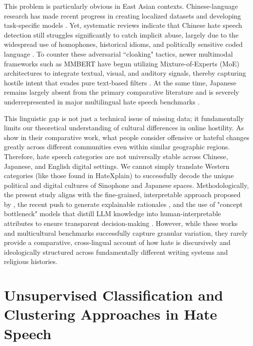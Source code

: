 \documentclass[../CLthesis.tex]{subfiles}
\begin{document}
This problem is particularly obvious in East Asian contexts. Chinese-language research has made recent progress in creating localized datasets and developing task-specific models \citep{rao_robertachinese_2023}. Yet, systematic reviews indicate that Chinese hate speech detection still struggles significantly to catch implicit abuse, largely due to the widespread use of homophones, historical idioms, and politically sensitive coded language \citep{xiao_chinese_2024}. To counter these adversarial ``cloaking" tactics, newer multimodal frameworks such as MMBERT have begun utilizing Mixture-of-Experts (MoE) architectures to integrate textual, visual, and auditory signals, thereby capturing hostile intent that evades pure text-based filters \citep{xue2025mmbertscaledmixtureofexpertsmultimodal}. At the same time, Japanese remains largely absent from the primary comparative literature and is severely underrepresented in major multilingual hate speech benchmarks \citep{corazza_multilingual_2020, aluru_deep_2020, bigoulaeva_addressing_2022}.

This linguistic gap is not just a technical issue of missing data; it fundamentally limits our theoretical understanding of cultural differences in online hostility. As \citet{lee_exploring_2024} show in their comparative work, what people consider offensive or hateful changes greatly across different communities even within similar geographic regions. Therefore, hate speech categories are not universally stable across Chinese, Japanese, and English digital settings. We cannot simply translate Western categories (like those found in HateXplain) to successfully decode the unique political and digital cultures of Sinophone and Japanese spaces. Methodologically, the present study aligns with the fine-grained, interpretable approach proposed by \citet{ollagnier_unsupervised_2023}, the recent push to generate explainable rationales \citep{hashir-targe-2025}, and the use of "concept bottleneck" models that distill LLM knowledge into human-interpretable attributes to ensure transparent decision-making \citep{labadietamayo2025distillingknowledgelargelanguage}. However, while these works and multicultural benchmarks \citep{bbui_multi3hate_2025} successfully capture granular variation, they rarely provide a comparative, cross-lingual account of how hate is discursively and ideologically structured across fundamentally different writing systems and religious histories.

\section{Unsupervised Classification and Clustering Approaches in Hate Speech}
\end{document}

